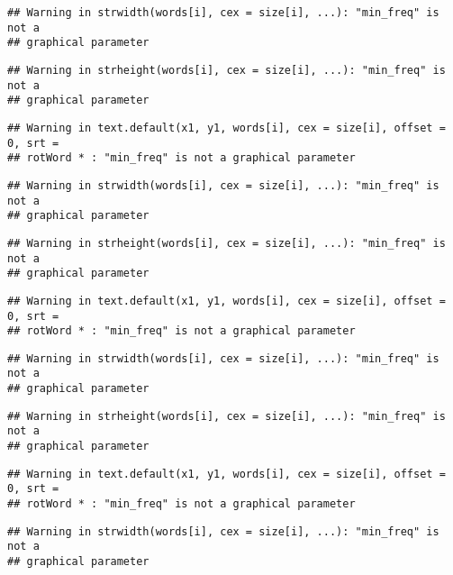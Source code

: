 \documentclass[]{article}
\begin{document}
\begin{verbatim}
## Warning in strwidth(words[i], cex = size[i], ...): "min_freq" is not a
## graphical parameter
\end{verbatim}

\begin{verbatim}
## Warning in strheight(words[i], cex = size[i], ...): "min_freq" is not a
## graphical parameter
\end{verbatim}

\begin{verbatim}
## Warning in text.default(x1, y1, words[i], cex = size[i], offset = 0, srt =
## rotWord * : "min_freq" is not a graphical parameter
\end{verbatim}

\begin{verbatim}
## Warning in strwidth(words[i], cex = size[i], ...): "min_freq" is not a
## graphical parameter
\end{verbatim}

\begin{verbatim}
## Warning in strheight(words[i], cex = size[i], ...): "min_freq" is not a
## graphical parameter
\end{verbatim}

\begin{verbatim}
## Warning in text.default(x1, y1, words[i], cex = size[i], offset = 0, srt =
## rotWord * : "min_freq" is not a graphical parameter
\end{verbatim}

\begin{verbatim}
## Warning in strwidth(words[i], cex = size[i], ...): "min_freq" is not a
## graphical parameter
\end{verbatim}

\begin{verbatim}
## Warning in strheight(words[i], cex = size[i], ...): "min_freq" is not a
## graphical parameter
\end{verbatim}

\begin{verbatim}
## Warning in text.default(x1, y1, words[i], cex = size[i], offset = 0, srt =
## rotWord * : "min_freq" is not a graphical parameter
\end{verbatim}

\begin{verbatim}
## Warning in strwidth(words[i], cex = size[i], ...): "min_freq" is not a
## graphical parameter
\end{verbatim}
\end{document}
